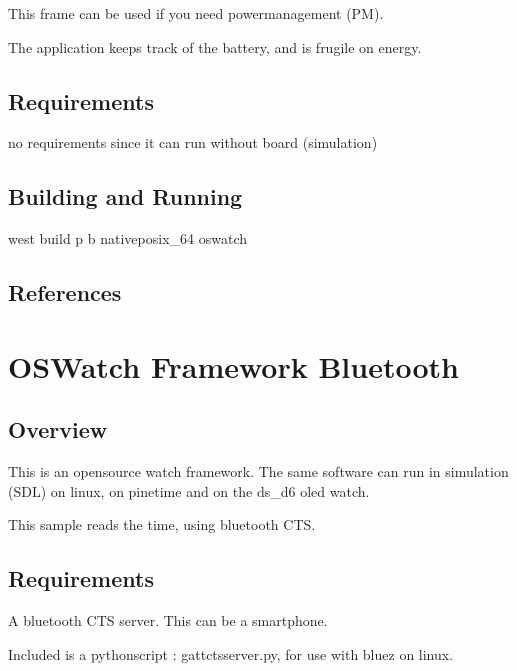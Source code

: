 \documentclass[letterpaper,10pt,english]{sphinxmanual}
\begin{document}
This frame can be used if you need powermanagement (PM).

The application keeps track of the battery, and is frugile on energy.


\subsection{Requirements}
\label{\detokenize{samples/oswatch-batteryREADME:requirements}}
no requirements since it can run without board (simulation)


\subsection{Building and Running}
\label{\detokenize{samples/oswatch-batteryREADME:building-and-running}}
west build \sphinxhyphen{}p \sphinxhyphen{}b  native\sphinxhyphen{}posix\_64 oswatch


\subsection{References}
\label{\detokenize{samples/oswatch-batteryREADME:references}}

\section{OSWatch Framework Bluetooth}
\label{\detokenize{samples/oswatch-btREADME:oswatch-framework-bluetooth}}\label{\detokenize{samples/oswatch-btREADME:oswatch}}\label{\detokenize{samples/oswatch-btREADME::doc}}

\subsection{Overview}
\label{\detokenize{samples/oswatch-btREADME:overview}}
This is an opensource watch framework.
The same software can run in simulation (SDL) on linux, on pinetime and on the ds\_d6 oled watch.

This sample reads the time, using bluetooth CTS.


\subsection{Requirements}
\label{\detokenize{samples/oswatch-btREADME:requirements}}
A bluetooth CTS server.
This can be a smartphone.

Included is a python\sphinxhyphen{}script : gatt\sphinxhyphen{}cts\sphinxhyphen{}server.py, for use with bluez on linux.
\end{document}
